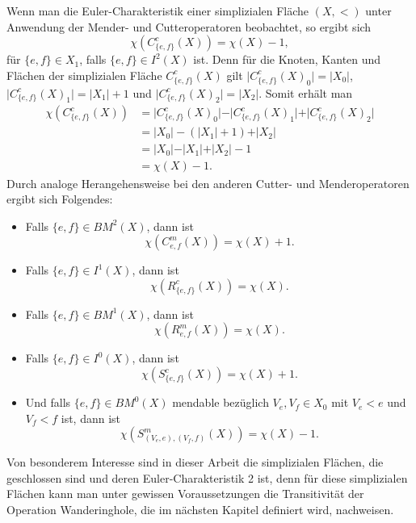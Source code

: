 \documentclass[12pt,titlepage,twoside,cleardoublepage]{article}
\theoremstyle{nummermitklammern}
\numberwithin{equation}{section}
\begin{document}
Wenn man die Euler-Charakteristik einer simplizialen Fläche $(X,<)$ unter Anwendung der Mender- und Cutteroperatoren beobachtet, so ergibt sich  
\[
\chi(C^c_{\{e,f\}}(X))=\chi(X)-1,
\]
für $\{e,f\} \in X_1$, falls $\{e,f\} \in I^2(X)$ ist. Denn für die Knoten, Kanten und Flächen der simplizialen Fläche $C^c_{\{e,f\}}(X)$ gilt $\vert C^c_{\{e,f\}}(X)_0 \vert =\vert X_0\vert $, $\vert C^c_{\{e,f\}}(X)_1 \vert =\vert X_1\vert +1$ und $\vert C^c_{\{e,f\}}(X)_2 \vert =\vert X_2\vert $. Somit erhält man 
\begin{align*}
\chi(C^c_{\{e,f\}}(X))&=\vert C^c_{\{e,f\}}(X)_0 \vert-\vert C^c_{\{e,f\}}(X)_1 \vert+\vert C^c_{\{e,f\}}(X)_2 \vert\\
&=\vert X_0\vert-(\vert X_1\vert+1)+\vert X_2\vert\\
&=\vert X_0\vert-\vert X_1\vert+\vert X_2\vert -1\\
&=\chi(X)-1.
\end{align*}
Durch analoge Herangehensweise bei den anderen Cutter- und Menderoperatoren ergibt sich Folgendes:
\begin{itemize}
\item Falls $\{e,f\} \in BM^2(X)$, dann ist 
\[
\chi(C^m_{e,f}(X))=\chi(X)+1.
\]
\item Falls $\{e,f\} \in I^1(X)$, dann ist 
\[
\chi(R^c_{\{e,f\}}(X))=\chi(X).
\]
\item Falls $\{e,f\} \in BM^1(X)$, dann ist 
\[
\chi(R^m_{e,f}(X))=\chi(X).
\]
\item Falls $\{e,f\} \in I^0(X)$, dann ist 
\[
\chi(S^c_{\{e,f\}}(X))=\chi(X)+1.
\]
\item Und falls $\{e,f\} \in BM^0(X)$ mendable bezüglich $V_e,V_f \in X_0$ mit $V_e<e$ und $V_f<f$ ist, dann ist 
\[
\chi(S^m_{(V_e,e),(V_f,f)}(X))=\chi(X)-1.
\]
\end{itemize}
Von besonderem Interesse sind in dieser Arbeit die simplizialen Flächen, die geschlossen sind und deren Euler-Charakteristik 2 ist,  denn für diese simplizialen Flächen kann man unter gewissen Voraussetzungen die Transitivität der Operation Wanderinghole, die im nächsten Kapitel definiert wird, nachweisen.
\newpage
\end{document}
